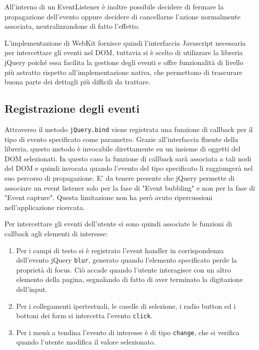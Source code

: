 All'interno di un EventListener è inoltre possibile decidere di fermare la propagazione dell'evento oppure decidere di cancellarne l'azione normalmente associata, neutralizzandone di fatto l'effetto.

L'implementazione di WebKit fornisce quindi l'interfaccia Javascript necessaria per intercettare gli eventi nel DOM, tuttavia si è scelto di utilizzare la libreria jQuery poiché essa facilita la gestione degli eventi e offre funzionalità di livello più astratto rispetto all'implementazione nativa, che permettono di trascurare buona parte dei dettagli più difficili da trattare.

\subsection{Registrazione degli eventi}

Attraverso il metodo \verb|jQuery.bind| viene registrata una funzione di callback per il tipo di evento specificato come parametro. Grazie all'interfaccia fluente della libreria, questo metodo è invocabile direttamente su un insieme di oggetti del DOM selezionati. In questo caso la funzione di callback sarà associata a tali nodi del DOM e quindi invocata quando l'evento del tipo specificato li raggiungerà nel suo percorso di propagazione. E' da tenere presente che jQuery permette di associare un event listener solo per la fase di "Event bubbling" e non per la fase di "Event capture". Questa limitazione non ha però avuto ripercussioni nell'applicazione ricercata. 

Per intercettare gli eventi dell'utente si sono quindi associate le funzioni di callback agli elementi di interesse:

\begin{enumerate}
\item Per i campi di testo si è registrato l'event handler in corrispondenza dell'evento jQuery \verb|blur|, generato quando l'elemento specificato perde la proprietà di focus. Ciò accade quando l'utente interagisce con un altro elemento della pagina, segnalando di fatto di aver terminato la digitazione dell'input.

\item Per i collegamenti ipertestuali, le caselle di selezione, i radio button ed i bottoni dei form si intercetta l'evento \verb|click|.

\item Per i menù a tendina l'evento di interesse è di tipo \verb|change|, che si verifica quando l'utente modifica il valore selezionato.

\end{enumerate}

